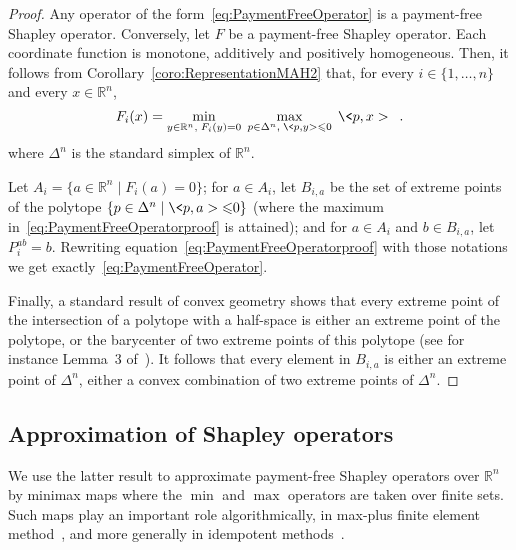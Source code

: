 \documentclass[a4paper,11pt]{amsart}
\theoremstyle{definition}
\theoremstyle{remark}
\begin{document}
\begin{proof}
  Any operator of the form~\eqref{eq:PaymentFreeOperator} is a payment-free Shapley operator.
  Conversely, let $F$ be a payment-free Shapley operator.
  Each coordinate function is monotone, additively and positively homogeneous.
  Then, it follows from Corollary~\ref{coro:RepresentationMAH2} that, for every $i \in \{1,\dots,n\}$ and every $x \in {\mathbb{R}}^n$,
  \begin{equation}
    \label{eq:PaymentFreeOperatorproof}
    F_i(x) = \min_{ y \in {\mathbb{R}}^n, \; F_i(y)=0 } \; \max_{ p \in \Delta^n, \; \<p,y> {\leqslant} 0 } \; \<p,x> \enspace .
  \end{equation}
  where $\Delta^n$ is the standard simplex of ${\mathbb{R}}^n$.

  Let $A_i = \{ a \in {\mathbb{R}}^n \mid F_i(a)=0 \}$; for $a \in A_i$, let $B_{i,a}$ be the set of extreme points of the polytope $\{p \in \Delta^n \mid \<p,a> {\leqslant} 0\}$ (where the maximum in~\eqref{eq:PaymentFreeOperatorproof} is attained); and for $a \in A_i$ and $b \in B_{i,a}$, let $P_i^{a b} = b$.
  Rewriting equation~\eqref{eq:PaymentFreeOperatorproof} with those notations we get exactly~\eqref{eq:PaymentFreeOperator}.

  Finally, a standard result of convex geometry shows that every extreme point of the intersection of a polytope with a half-space is either an extreme point of the polytope, or the barycenter of two extreme points of this polytope (see for instance Lemma~3 of~\cite{FP96}).
  It follows that every element in $B_{i,a}$ is either an extreme point of $\Delta^n$, either a convex combination of two extreme points of $\Delta^n$.
\end{proof}

\subsection{Approximation of Shapley operators}

We use the latter result to approximate payment-free Shapley operators over ${\mathbb{R}}^n$ by minimax maps where the $\min$ and $\max$ operators are taken over finite sets.
Such maps play an important role algorithmically, in max-plus finite element method~\cite{AGL08},
and more generally in idempotent methods~\cite{McE11,McEP15}. 
\end{document}
